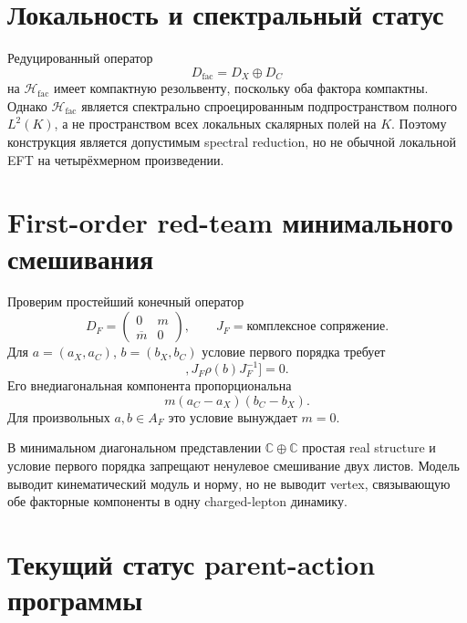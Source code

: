 \section{Локальность и спектральный статус}

Редуцированный оператор
\begin{equation}
 D_{\mathrm{fac}}=D_X\oplus D_C
\end{equation}
на \(\mathcal H_{\mathrm{fac}}\) имеет компактную резольвенту, поскольку оба
фактора компактны. Однако \(\mathcal H_{\mathrm{fac}}\) является
спектрально спроецированным подпространством полного \(L^2(K)\), а не
пространством всех локальных скалярных полей на \(K\). Поэтому конструкция
является допустимым spectral reduction, но не обычной локальной EFT на
четырёхмерном произведении.

\section{First-order red-team минимального смешивания}

Проверим простейший конечный оператор
\begin{equation}
 D_F=\begin{pmatrix}0&m\\\overline m&0\end{pmatrix},
 \qquad
 J_F=\text{комплексное сопряжение}.
\end{equation}
Для \(a=(a_X,a_C)\), \(b=(b_X,b_C)\) условие первого порядка требует
\begin{equation}
 [[D_F,\rho(a)],J_F\rho(b)J_F^{-1}]=0.
\end{equation}
Его внедиагональная компонента пропорциональна
\begin{equation}
 m(a_C-a_X)(b_C-b_X).
\end{equation}
Для произвольных \(a,b\in A_F\) это условие вынуждает \(m=0\).

\begin{nogocriterion}
В минимальном диагональном представлении
\(\mathbb C\oplus\mathbb C\) простая real structure и условие первого
порядка запрещают ненулевое смешивание двух листов. Модель выводит
кинематический модуль и норму, но не выводит vertex, связывающую обе
факторные компоненты в одну charged-lepton динамику.
\end{nogocriterion}

\section{Текущий статус parent-action программы}

